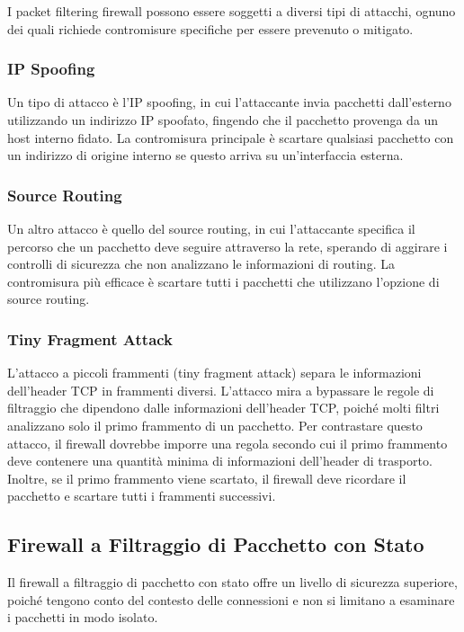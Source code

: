 I packet filtering firewall possono essere soggetti a diversi tipi di attacchi, ognuno dei quali richiede contromisure specifiche per essere prevenuto o mitigato.

\subsubsection{IP Spoofing}

Un tipo di attacco è l'IP spoofing, in cui l'attaccante invia pacchetti dall'esterno utilizzando un indirizzo IP spoofato, fingendo che il pacchetto provenga da un host interno fidato. La contromisura principale è scartare qualsiasi pacchetto con un indirizzo di origine interno se questo arriva su un'interfaccia esterna.

\subsubsection{Source Routing}

Un altro attacco è quello del source routing, in cui l'attaccante specifica il percorso che un pacchetto deve seguire attraverso la rete, sperando di aggirare i controlli di sicurezza che non analizzano le informazioni di routing. La contromisura più efficace è scartare tutti i pacchetti che utilizzano l'opzione di source routing.

\subsubsection{Tiny Fragment Attack}

L'attacco a piccoli frammenti (tiny fragment attack) separa le informazioni dell'header TCP in frammenti diversi. L'attacco mira a bypassare le regole di filtraggio che dipendono dalle informazioni dell'header TCP, poiché molti filtri analizzano solo il primo frammento di un pacchetto. Per contrastare questo attacco, il firewall dovrebbe imporre una regola secondo cui il primo frammento deve contenere una quantità minima di informazioni dell'header di trasporto. Inoltre, se il primo frammento viene scartato, il firewall deve ricordare il pacchetto e scartare tutti i frammenti successivi.

\subsection{Firewall a Filtraggio di Pacchetto con Stato}

Il firewall a filtraggio di pacchetto con stato offre un livello di sicurezza superiore, poiché tengono conto del contesto delle connessioni e non si limitano a esaminare i pacchetti in modo isolato.

